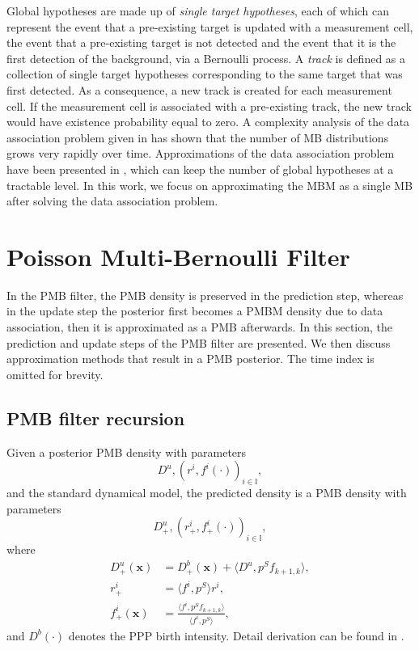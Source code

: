 \documentclass[conference]{IEEEtran}
\begin{document}
Global hypotheses are made up of \textit{single target hypotheses}, each of which can represent the event that a pre-existing target is updated with a measurement cell, the event that a pre-existing target is not detected and the event that it is the first detection of the background, via a Bernoulli process. A \textit{track} is defined as a collection of single target hypotheses corresponding to the same target that was first detected. As a consequence, a new track is created for each measurement cell. If the measurement cell is associated with a pre-existing track, the new track would have existence probability equal to zero. A complexity analysis of the data association problem given in \cite{pmbmextended2} has shown that the number of MB distributions grows very rapidly over time. Approximations of the data association problem have been presented in \cite{pmbmextended2,soextended}, which can keep the number of global hypotheses at a tractable level. In this work, we focus on approximating the MBM as a single MB after solving the data association problem. 


\section{Poisson Multi-Bernoulli Filter}
In the PMB filter, the PMB density is preserved in the prediction step, whereas in the update step the posterior first becomes a PMBM density due to data association, then it is approximated as a PMB afterwards. In this section, the prediction and update steps of the PMB filter are presented. We then discuss approximation methods that result in a PMB posterior. The time index is omitted for brevity. 

\subsection{PMB filter recursion}
Given a posterior PMB density with parameters
\begin{equation}
D^u, {(r^i ,f^i(\cdot) )}_{i\in\mathbb{I}},
\end{equation}
and the standard dynamical model, the predicted density is a PMB density with parameters
\begin{equation}
D^u_+, {(r_+^i ,f_+^i(\cdot) )}_{i\in\mathbb{I}},
\label{eq:prediction}
\end{equation}
where 
\begin{subequations}
\begin{align}
    D^u_+(\mathbf{x}) &= D^b_+(\mathbf{x})+\langle D^u,p^Sf_{k+1,k}\rangle,\\
    r^i_+ &= \langle f^i,p^S\rangle r^i,\\
    f_+^i(\mathbf{x}) &= \frac{\langle f^i,p^Sf_{k+1,k}\rangle}{\langle f^i,p^S\rangle},
\end{align}
\end{subequations}
and $D^b(\cdot)$ denotes the PPP birth intensity. Detail derivation can be found in \cite{pmbmpoint}. 
\end{document}
